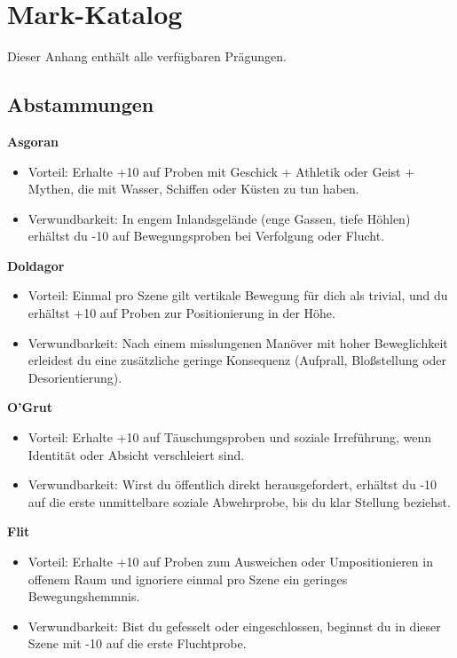 \chapter{Mark-Katalog}
\label{app:marks}

Dieser Anhang enthält alle verfügbaren Prägungen.

\section{Abstammungen}\label{sec:abstammungen}
\noindent\textbf{Asgoran}\par
\begin{itemize}[leftmargin=*,nosep]
\item Vorteil: Erhalte +10 auf Proben mit Geschick + Athletik oder Geist + Mythen, die mit Wasser, Schiffen oder Küsten zu tun haben.
\item Verwundbarkeit: In engem Inlandsgelände (enge Gassen, tiefe Höhlen) erhältst du -10 auf Bewegungsproben bei Verfolgung oder Flucht.
\end{itemize}
\noindent\textbf{Doldagor}\par
\begin{itemize}[leftmargin=*,nosep]
\item Vorteil: Einmal pro Szene gilt vertikale Bewegung für dich als trivial, und du erhältst +10 auf Proben zur Positionierung in der Höhe.
\item Verwundbarkeit: Nach einem misslungenen Manöver mit hoher Beweglichkeit erleidest du eine zusätzliche geringe Konsequenz (Aufprall, Bloßstellung oder Desorientierung).
\end{itemize}
\noindent\textbf{O'Grut}\par
\begin{itemize}[leftmargin=*,nosep]
\item Vorteil: Erhalte +10 auf Täuschungsproben und soziale Irreführung, wenn Identität oder Absicht verschleiert sind.
\item Verwundbarkeit: Wirst du öffentlich direkt herausgefordert, erhältst du -10 auf die erste unmittelbare soziale Abwehrprobe, bis du klar Stellung beziehst.
\end{itemize}
\noindent\textbf{Flit}\par
\begin{itemize}[leftmargin=*,nosep]
\item Vorteil: Erhalte +10 auf Proben zum Ausweichen oder Umpositionieren in offenem Raum und ignoriere einmal pro Szene ein geringes Bewegungshemmnis.
\item Verwundbarkeit: Bist du gefesselt oder eingeschlossen, beginnst du in dieser Szene mit -10 auf die erste Fluchtprobe.
\end{itemize}
